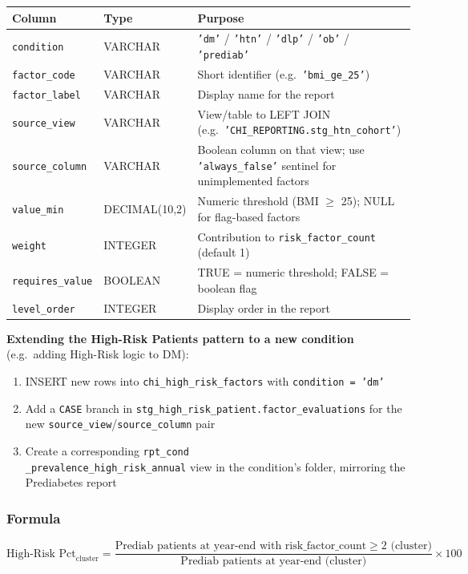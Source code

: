 \documentclass[11pt,a4paper]{article}
\begin{document}
\begin{table}[ht]
\centering\small
\begin{tabular}{@{}p{} p{} p{}@{}}
\toprule
\textbf{Column} & \textbf{Type} & \textbf{Purpose} \\
\midrule
\texttt{condition} & VARCHAR & \texttt{'dm'} / \texttt{'htn'} / \texttt{'dlp'} / \texttt{'ob'} / \texttt{'prediab'} \\
\texttt{factor\_code} & VARCHAR & Short identifier (e.g.\ \texttt{'bmi\_ge\_25'}) \\
\texttt{factor\_label} & VARCHAR & Display name for the report \\
\texttt{source\_view} & VARCHAR & View/table to LEFT JOIN (e.g.\ \texttt{'CHI\_REPORTING.stg\_htn\_cohort'}) \\
\texttt{source\_column} & VARCHAR & Boolean column on that view; use \texttt{'always\_false'} sentinel for unimplemented factors \\
\texttt{value\_min} & DECIMAL(10,2) & Numeric threshold (BMI $\geq$ 25); NULL for flag-based factors \\
\texttt{weight} & INTEGER & Contribution to \texttt{risk\_factor\_count} (default 1) \\
\texttt{requires\_value} & BOOLEAN & TRUE = numeric threshold; FALSE = boolean flag \\
\texttt{level\_order} & INTEGER & Display order in the report \\
\bottomrule
\end{tabular}
\end{table}

\textbf{Extending the High-Risk Patients pattern to a new condition} (e.g.\ adding High-Risk logic to DM):
\begin{enumerate}[leftmargin=*]
    \item INSERT new rows into \texttt{chi\_high\_risk\_factors} with \texttt{condition = 'dm'}
    \item Add a \texttt{CASE} branch in \texttt{stg\_high\_risk\_patient.factor\_evaluations} for the new \texttt{source\_view}/\texttt{source\_column} pair
    \item Create a corresponding \texttt{rpt\_{cond}\\_prevalence\_high\_risk\_annual} view in the condition's folder, mirroring the Prediabetes report
\end{enumerate}

\subsubsection{Formula}
\begin{equation}
\text{High-Risk Pct}_{\text{cluster}} = \frac{\text{Prediab patients at year-end with risk\_factor\_count} \geq 2 \text{ (cluster)}}{\text{Prediab patients at year-end (cluster)}} \times 100
\end{equation}
\end{document}
